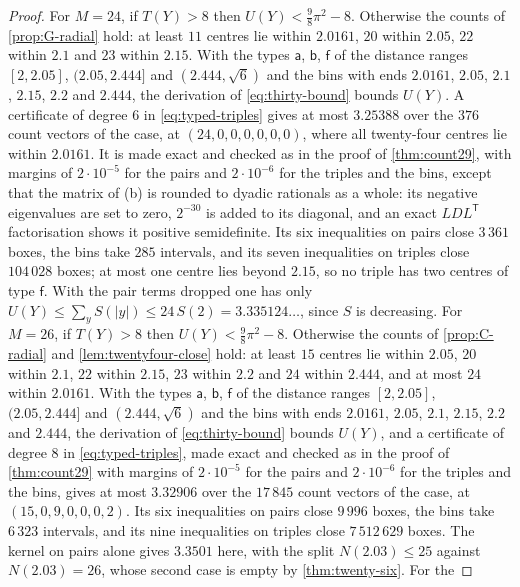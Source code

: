 \documentclass[11pt,reqno]{amsart}
\renewcommand{\_}{\origunderscore\allowbreak}
\numberwithin{equation}{section}
\theoremstyle{plain}
\theoremstyle{definition}
\theoremstyle{remark}
\begin{document}
\begin{proof}
For $M=24$, if $T(Y)>8$ then $U(Y)<\frac98\pi^2-8$. Otherwise the counts of
\cref{prop:G-radial} hold: at least $11$ centres lie within $2.0161$, $20$
within $2.05$, $22$ within $2.1$ and $23$ within $2.15$. With the types
$\mathsf a$, $\mathsf b$, $\mathsf f$ of the distance ranges $[2,2.05]$,
$(2.05,2.444]$ and $(2.444,\sqrt6)$ and the bins with ends $2.0161$, $2.05$,
$2.1$, $2.15$, $2.2$ and $2.444$, the derivation of \eqref{eq:thirty-bound}
bounds $U(Y)$. A certificate of degree $6$ in \eqref{eq:typed-triples}
gives at most $3.25388$ over the $376$ count vectors of the case, at
$(24,0,0,0,0,0,0)$, where all twenty-four centres lie within $2.0161$. It is
made exact and checked as in the proof of \cref{thm:count29}, with margins
of $2\cdot10^{-5}$ for the pairs and $2\cdot10^{-6}$ for the triples and
the bins, except that the matrix of (b) is rounded to dyadic rationals as a
whole: its negative eigenvalues are set to zero, $2^{-30}$ is added to its
diagonal, and an exact $LDL^{\mathsf T}$ factorisation shows it positive
semidefinite. Its six inequalities on pairs close $3\,361$ boxes, the bins take $285$
intervals, and its seven inequalities on triples close $104\,028$ boxes;
at most one centre lies beyond $2.15$, so no triple has two centres of type
$\mathsf f$. With the pair terms dropped one has only
$U(Y)\le\sum_yS(|y|)\le24\,S(2)=3.335124\ldots$, since $S$ is decreasing.
For $M=26$, if
$T(Y)>8$ then $U(Y)<\frac98\pi^2-8$. Otherwise the counts of
\cref{prop:C-radial} and \cref{lem:twentyfour-close} hold: at least $15$
centres lie within $2.05$, $20$ within $2.1$, $22$ within $2.15$, $23$
within $2.2$ and $24$ within $2.444$, and at most $24$ within $2.0161$. With
the types $\mathsf a$, $\mathsf b$, $\mathsf f$ of the distance ranges
$[2,2.05]$, $(2.05,2.444]$ and $(2.444,\sqrt6)$ and the bins with ends
$2.0161$, $2.05$, $2.1$, $2.15$, $2.2$ and $2.444$, the derivation of
\eqref{eq:thirty-bound} bounds $U(Y)$, and a certificate of degree $8$ in
\eqref{eq:typed-triples}, made exact and checked as in the proof of
\cref{thm:count29} with margins of $2\cdot10^{-5}$ for the pairs and
$2\cdot10^{-6}$ for the triples and the bins, gives at most $3.32906$ over the
$17\,845$ count vectors of the case, at $(15,0,9,0,0,0,2)$. Its six inequalities on
pairs close $9\,996$ boxes, the bins take $6\,323$ intervals, and
its nine inequalities on triples close $7\,512\,629$ boxes. The kernel on pairs
alone gives $3.3501$ here, with the split $N(2.03)\le25$ against
$N(2.03)=26$, whose second case is empty by \cref{thm:twenty-six}. For the

\end{proof}
\end{document}
